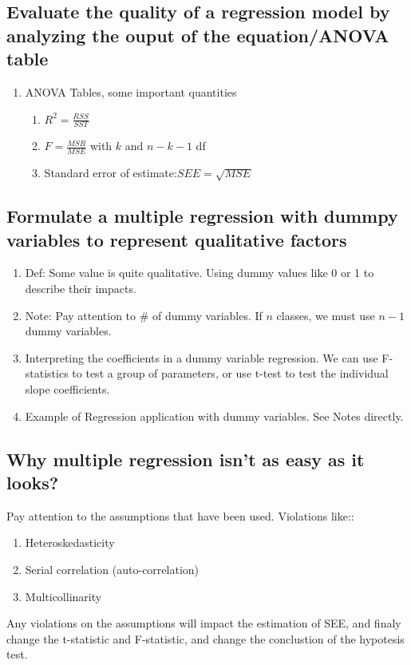 \documentclass{article}
\begin{document}
\subsection{Evaluate the quality of a regression model by analyzing the ouput of the equation/ANOVA table}
\begin{enumerate}
    \item ANOVA Tables, some important quantities
        \begin{enumerate}
            \item $R^2=\frac{RSS}{SST}$
            \item $F=\frac{MSR}{MSE}$ with $k$ and $n-k-1$ df
            \item Standard error of estimate:$SEE=\sqrt{MSE}$
        \end{enumerate}
\end{enumerate}
\subsection{Formulate a multiple regression with dummpy variables to represent qualitative factors}
\begin{enumerate}
    \item Def: Some value is quite qualitative. Using dummy values like 0 or 1 
        to describe their impacts.
    \item Note: Pay attention to \# of dummy variables. If $n$ classes, we must use
        $n-1$ dummy variables.
    \item Interpreting the coefficients in a dummy variable regression. We can use F-statistics to
        test a group of parameters, or use t-test to test the individual slope coefficients.
    \item Example of Regression application with dummy variables. See Notes directly.
\end{enumerate}
\subsection{Why multiple regression isn't as easy as it looks?}
Pay attention to the assumptions that have been used. Violations like::
\begin{enumerate}
    \item Heteroskedasticity
    \item Serial correlation (auto-correlation)
    \item Multicollinarity
\end{enumerate}
Any violations on the assumptions will impact the estimation of SEE, and finaly 
change the t-statistic and F-statistic, and change the conclustion of the hypotesis
test.
\end{document}
